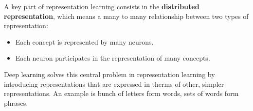 A key part of representation learning consists in the \textbf{distributed 
    representation}, which means a many to many relationship between two types
of representation:
\begin{itemize}
    \item Each concept is represented by many neurons.
    \item Each neuron participates in the representation of many concepts.
\end{itemize}

Deep learning solves this central problem in representation learning by introducing
representations that are expressed in therms of other, simpler representations.
An example is bunch of letters form words, sets of words form phrases.
